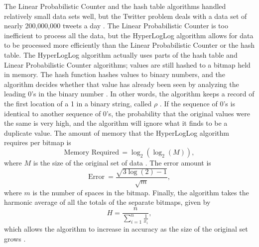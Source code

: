 \documentclass{article}
\begin{document}
\indent The Linear Probabilistic Counter and the hash table algorithms handled relatively small data sets well, but the Twitter problem deals with a data set of nearly 200,000,000 tweets a day \cite{Twitter-2}.
The Linear Probabilistic Counter is too inefficient to process all the data, but the HyperLogLog algorithm allows for data to be processed more efficiently than the Linear Probabilistic Counter or the hash table. 
The HyperLogLog algorithm actually uses parts of the hash table and Linear Probabilistic Counter algorithms; values are still hashed to a bitmap held in memory. 
The hash function hashes values to binary numbers, and the algorithm decides whether that value has already been seen by analyzing the leading 0's in the binary number \cite[pp. 685, 689]{Heule}.
In other words, the algorithm keeps a record of the first location of a 1 in a binary string, called $\rho$ \cite[pp. 130]{Flaj}.
If the sequence of 0's is identical to another sequence of 0's, the probability that the original values were the same is very high, and the algorithm will ignore what it finds to be a duplicate value. 
The amount of memory that the HyperLogLog algorithm requires per bitmap is
\[
\text{Memory Required}\, = \log_{2}{\left(\log_{2}{\left(M \right)}\right)},
\]
where $M$ is the size of the original set of data \cite[pp. 129]{Flaj}.
The error amount is
\[
\text{Error}\ = \frac{\sqrt{3\log{(2)} - 1}}{\sqrt{m}},
\]
where $m$ is the number of spaces in the bitmap.
Finally, the algorithm takes the harmonic average of all the totals of the separate bitmaps, given by
\[
H = \frac{n}{\sum_{i=1}^{n}\frac{1}{x_{i}}},
\] 
which allows the algorithm to increase in accuracy as the size of the original set grows \cite{Yousra}.\\
\end{document}
